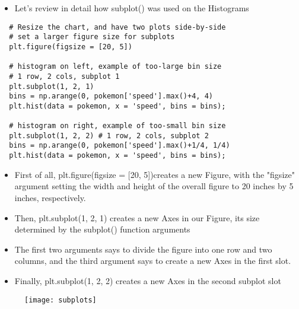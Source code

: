 \documentclass[12pt]{beamer}
\begin{document}
    \begin{frame}[fragile]{}
    	\begin{itemize}
    		\item Let's review in detail how subplot() was used on the Histograms
    	\end{itemize}
        \begin{verbatim}
  # Resize the chart, and have two plots side-by-side
  # set a larger figure size for subplots
  plt.figure(figsize = [20, 5]) 
  
  # histogram on left, example of too-large bin size
  # 1 row, 2 cols, subplot 1
  plt.subplot(1, 2, 1) 
  bins = np.arange(0, pokemon['speed'].max()+4, 4)
  plt.hist(data = pokemon, x = 'speed', bins = bins);
  
  # histogram on right, example of too-small bin size
  plt.subplot(1, 2, 2) # 1 row, 2 cols, subplot 2
  bins = np.arange(0, pokemon['speed'].max()+1/4, 1/4)
  plt.hist(data = pokemon, x = 'speed', bins = bins);
        \end{verbatim}
    \end{frame}
    \begin{frame}{}
    	\begin{itemize}
    		\item First of all, plt.figure(figsize = [20, 5])creates a new Figure, with the "figsize" argument setting the width and height of the overall figure to 20 inches by 5 inches, respectively.
    		\item Then, plt.subplot(1, 2, 1) creates a new Axes in our Figure, its size determined by the subplot() function arguments
    		\item The first two arguments says to divide the figure into one row and two columns, and the third argument says to create a new Axes in the first slot.
    		\item Finally, plt.subplot(1, 2, 2) creates a new Axes in the second subplot slot
    	\end{itemize}
        \begin{figure}
        	\centering
        	\texttt{[image: subplots]}
        \end{figure}
    \end{frame}
\end{document}
